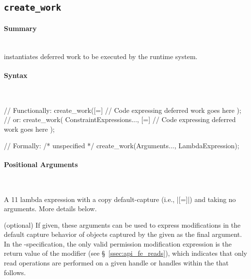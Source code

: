 \subsection{\texttt{create\_work}}
\label{ssec:api_fe_cw}

\paragraph{Summary}\mbox{}\\
 instantiates \gls{deferred work} to be executed by the \gls{runtime
system}.


\paragraph{Syntax}\mbox{}\\
\begin{CppCode}
// Functionally:
create_work([=]{
  // Code expressing deferred work goes here
});
// or:
create_work(
  ConstraintExpressions..., 
  [=]{
    // Code expressing deferred work goes here
  }
);

// Formally:
/* unspecified */ create_work(Arguments..., LambdaExpression);
\end{CppCode}


\paragraph{Positional Arguments}\mbox{}\\
\begin{compactitem}
\item {} A \CC{}11 \gls{lambda} expression with a copy
    default-\gls{capture} (i.e., |[=]|) and taking no arguments.  More details
  below.
\item {} (optional) If given, these
  arguments can be used to express modifications in the default \gls{capture} behavior
  of  objects captured by the 
  given as the final argument.  In the \specVersion-specification, the only valid permission
  modification expression is the return value of the  modifier
  (see \S~\ref{ssec:api_fe_reads}), which indicates that only read operations
  are performed on a given \gls{handle} or \glspl{handle} within the
   that follows.
\end{compactitem}


